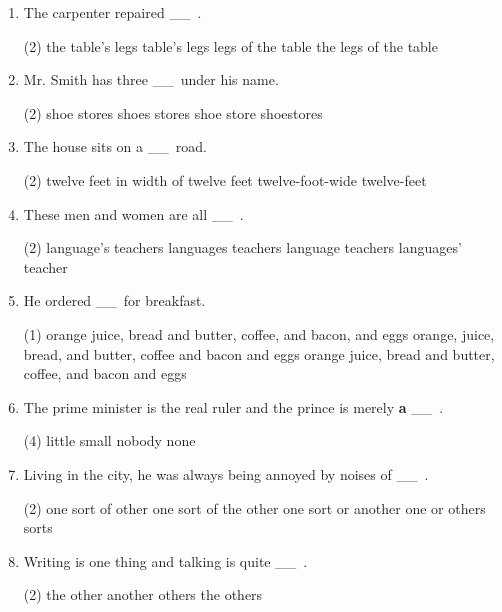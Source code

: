 \documentclass{yufa}
\newcommand\ttu{ \_\_\ }
\begin{document}
\begin{enumerate}
\item The carpenter repaired \ttu.
  \begin{tasks}(2)
    \task the table's legs
    \task table's legs
    \task legs of the table
    \task the legs of the table
  \end{tasks}

\item Mr. Smith has three \ttu under his name.
  \begin{tasks}(2)
    \task shoe stores \task shoes stores \task shoe store \task shoestores
  \end{tasks}

\item The house sits on a \ttu road.
  \begin{tasks}(2)
    \task twelve feet in width
    \task of twelve feet
    \task twelve-foot-wide
    \task twelve-feet
  \end{tasks}

\item These men and women are all \ttu .
  \begin{tasks}(2)
    \task language's teachers \task languages teachers
    \task language teachers \task languages' teacher
  \end{tasks}

\item He ordered  \ttu for breakfast.
  \begin{tasks}(1)
    \task orange juice, bread and butter, coffee, and bacon, and eggs
    \task orange, juice, bread, and butter, coffee and bacon and eggs
    \task orange juice, bread and butter, coffee, and bacon and eggs
  \end{tasks}

\item The prime minister is the real ruler and the prince is merely \textbf{a} \ttu .
  \begin{tasks}(4)
    \task little
    \task small
    \task nobody
    \task none
  \end{tasks}

\item Living in the city, he was always being annoyed by noises of  \ttu .
  \begin{tasks}(2)
    \task one sort of other
    \task one sort of the other
    \task one sort or another
    \task one or others sorts
  \end{tasks}

\item Writing is one thing and talking is quite \ttu .
  \begin{tasks}(2)
    \task the other
    \task another
    \task others
    \task the others
  \end{tasks}


\end{enumerate}
\end{document}
